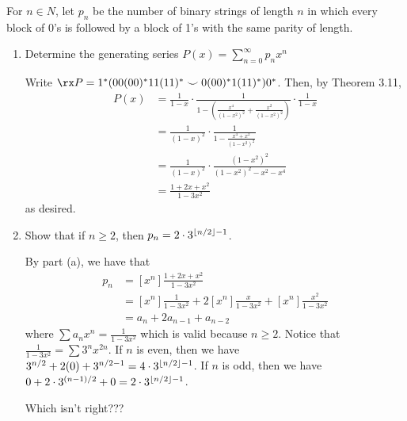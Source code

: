 \begin{xca}
  For $n \in N$, let $p_n$ be the number of binary strings of length $n$
  in which every block of 0's is followed by a block of 1's with the same parity of length.
\end{xca}
\begin{enumerate}
  \item Determine the generating series $P(x) = \sum_{n=0}^\infty p_n x^n$
        \begin{sol}
          Write $\rx P = 1^*(00(00)^*11(11)^* \smile 0(00)^*1(11)^*)0^*$.
          Then, by Theorem 3.11,
          \begin{align*}
            P(x)
             & = \frac{1}{1-x}\cdot\frac{1}{1-(\frac{x^4}{(1-x^2)^2} + \frac{x^2}{(1-x^2)^2})}\cdot\frac{1}{1-x} \\
             & = \frac{1}{(1-x)^2}\cdot\frac{1}{1-\frac{x^4+x^2}{(1-x^2)^2}}                                     \\
             & = \frac{1}{(1-x)^2}\cdot\frac{(1-x^2)^2}{(1-x^2)^2-x^2-x^4}                                       \\
             & = \frac{1+2x+x^2}{1-3x^2}
          \end{align*}
          as desired.
        \end{sol}
  \item Show that if $n \geq 2$, then $p_n = 2\cdot 3^{\lfloor n/2\rfloor-1}$.
        \begin{sol}
          By part (a), we have that
          \begin{align*}
            p_n
             & = [x^n] \frac{1+2x+x^2}{1-3x^2}                                              \\
             & = [x^n] \frac{1}{1-3x^2} + 2[x^n] \frac{x}{1-3x^2} + [x^n]\frac{x^2}{1-3x^2} \\
             & = a_n + 2a_{n-1} + a_{n-2}
          \end{align*}
          where $\sum a_n x^n = \frac{1}{1-3x^2}$ which is valid because $n \geq 2$.
          Notice that $\frac{1}{1-3x^2} = \sum 3^n x^{2n}$.
          If $n$ is even, then we have $3^{n/2}+ 2(0) + 3^{n/2-1} = 4\cdot 3^{\lfloor n/2\rfloor-1}$.
          If $n$ is odd, then we have $0 + 2\cdot 3^{(n-1)/2} + 0 = 2\cdot 3^{\lfloor n/2\rfloor-1}$.

          Which isn't right???
        \end{sol}
\end{enumerate}

